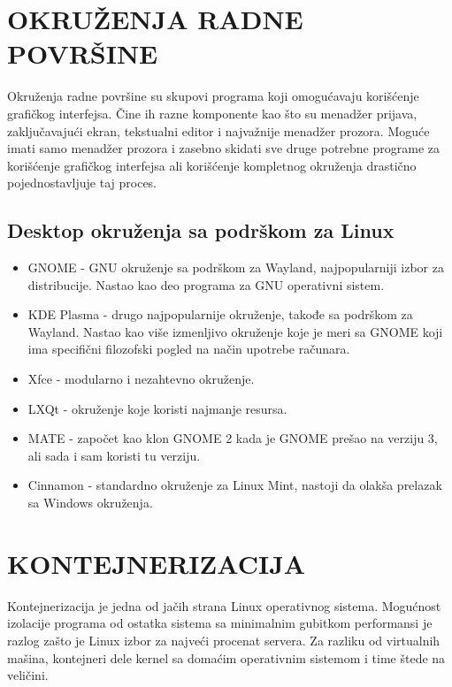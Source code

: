 \documentclass[a4paper,14pt]{article}
\begin{document}
\section{OKRUŽENJA RADNE POVRŠINE}
Okruženja radne površine su skupovi programa koji omogućavaju korišćenje grafičkog interfejsa. Čine ih razne komponente kao što su menadžer prijava, zaključavajući ekran, tekstualni editor i najvažnije menadžer prozora. Moguće imati samo menadžer prozora i zasebno skidati sve druge potrebne programe za korišćenje grafičkog interfejsa ali korišćenje kompletnog okruženja drastično pojednostavljuje taj proces.
\subsection{Desktop okruženja sa podrškom za Linux}
\begin{itemize}
\item GNOME\cite{gnome} - GNU okruženje sa podrškom za Wayland, najpopularniji izbor za distribucije. Nastao kao deo programa za GNU operativni sistem.
\item KDE Plasma\cite{kdeplasma}  - drugo najpopularnije okruženje, takođe sa podrškom za Wayland. Nastao kao više izmenljivo okruženje koje je meri sa GNOME koji ima specifični filozofski pogled na način upotrebe računara.
\item Xfce\cite{xfce} - modularno i nezahtevno okruženje.
\item LXQt\cite{lxqt} - okruženje koje koristi najmanje resursa.
\item MATE\cite{mate} - započet kao klon GNOME 2 kada je GNOME prešao na verziju 3, ali sada i sam koristi tu verziju.
\item Cinnamon\cite{cinnamon} - standardno okruženje za Linux Mint, nastoji da olakša prelazak sa Windows okruženja.
\end{itemize}
\newpage

\section{KONTEJNERIZACIJA}
Kontejnerizacija je jedna od jačih strana Linux operativnog sistema. Mogućnost izolacije programa od ostatka sistema sa minimalnim gubitkom performansi je razlog zašto je Linux izbor za najveći procenat servera. Za razliku od virtualnih mašina, kontejneri dele kernel sa domaćim operativnim sistemom i time štede na veličini.
\end{document}

